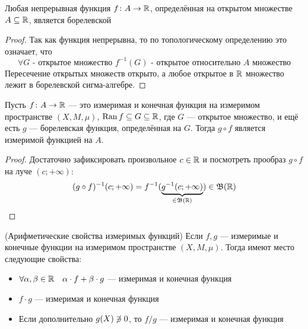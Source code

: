 \begin{proposition}
	Любая непрерывная функция $f \colon A \to \mathbb{R}$, определённая на открытом множестве $A \subseteq \mathbb{R}$, является борелевской
\end{proposition}

\begin{proof}
	Так как функция непрерывна, то по топологическому определению это означает, что
	\[
		\forall G \text{ - открытое множество } f^{-1}(G) \text{ - открытое относительно $A$ множество}
	\]
	Пересечение открытых множеств открыто, а любое открытое в $\mathbb{R}$ множество лежит в борелевской сигма-алгебре.
\end{proof}

\begin{theorem}
	Пусть $f \colon A \to \mathbb{R}$ --- это измеримая и конечная функция на измеримом пространстве $(X, M, \mu)$, $\operatorname{Ran} f \subseteq G \subseteq \mathbb{R}$, где $G$ --- открытое множество, и ещё есть $g$ --- борелевская функция, определённая на $G$. Тогда $g \circ f$ является измеримой функцией на $A$.
\end{theorem}

\begin{proof}
	Достаточно зафиксировать произвольное $c \in \mathbb{R}$ и посмотреть прообраз $g \circ f$ на луче $(c; +\infty)$:
	\[
		(g \circ f)^{-1}(c; +\infty) = f^{-1}(\underbrace{g^{-1}(c; +\infty)}_{\in \mathfrak{B}(\mathbb{R})}) \in \mathfrak{B}(\mathbb{R})
	\]
\end{proof}

\begin{theorem} (Арифметические свойства измеримых функций)
	Если $f, g$ --- измеримые и конечные функции на измеримом пространстве $(X, M, \mu)$. Тогда имеют место следующие свойства:
	\begin{itemize}
		\item $\forall \alpha, \beta \in \mathbb{R} \quad \alpha \cdot f + \beta \cdot g$ --- измеримая и конечная функция
		
		\item $f \cdot g$ --- измеримая и конечная функция
		
		\item Если дополнительно $g(X) \centernot\ni 0$, то $f / g$ --- измеримая и конечная функция
	\end{itemize}
\end{theorem}

